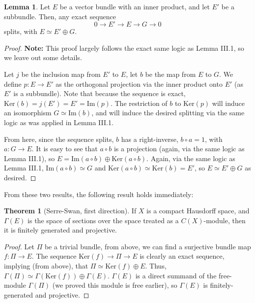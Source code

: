 \documentclass[aps,pra,showpacs,notitlepage,onecolumn,superscriptaddress,nofootinbib]{revtex4-1}
\theoremstyle{definition}
\newtheorem{lemma}{Lemma}[section]
\newtheorem{theorem}{Theorem}[section]
\begin{document}
\begin{lemma}
  Let $E$ be a vector bundle with an inner product, and let $E'$ be a subbundle. Then, any exact sequence
  \begin{equation}
    0 \longrightarrow E' \longrightarrow E \longrightarrow G \longrightarrow 0
  \end{equation}
  splits, with $E \simeq E' \oplus G$.
\end{lemma}
\begin{proof}
  \textbf{Note:} This proof largely follows the exact same logic as Lemma III.1, so we leave out some details.
  \newline

  Let $j$ be the inclusion map from $E'$ to $E$, let $b$ be the map from $E$ to $G$. We define $p : E \rightarrow E'$ as the orthogonal projection via the inner product onto
  $E'$ (as $E'$ is a subbundle). Note that because the sequence is exact, $\text{Ker}(b) = j(E') = E' = \text{Im}(p)$.
  The restriction of $b$ to $\text{Ker}(p)$ will induce an isomorphism $G \simeq \text{Im}(b)$, and will induce the desired splitting via the same logic as was applied in Lemma III.1.

  From here, since the sequence splits, $b$ has a right-inverse, $b \circ a = 1$, with $a : G \rightarrow E$. It is easy to see that $a \circ b$ is a projection (again, via the same
  logic as Lemma III.1), so $E = \text{Im}(a \circ b) \oplus \text{Ker}(a \circ b)$. Again, via the same logic as Lemma III.1, $\text{Im}(a \circ b) \simeq G$ and $\text{Ker}(a \circ b) \simeq \text{Ker}(b) = E'$,
  so $E \simeq E' \oplus G$ as desired.
  \end{proof}

From these two results, the following result holds immediately:

\begin{theorem}[Serre-Swan, first direction]
  If $X$ is a compact Hausdorff space, and $\Gamma(E)$ is the space of sections over the space treated as a $C(X)$-module, then it is finitely generated and projective.
\end{theorem}

\begin{proof}
  Let $\Pi$ be a trivial bundle, from above, we can find a surjective bundle map $f : \Pi \rightarrow E$. The sequence $\text{Ker}(f) \to \Pi \to E$
  is clearly an exact sequence, implying (from above), that $\Pi \simeq \text{Ker}(f) \oplus E$. Thus, $\Gamma(\Pi) \simeq \Gamma(\text{Ker}(f)) \oplus \Gamma(E)$.
  $\Gamma(E)$ is a direct summand of the free-module $\Gamma(\Pi)$ (we proved this module is free earlier), so $\Gamma(E)$ is finitely-generated and projective.
  \end{proof}
\end{document}

